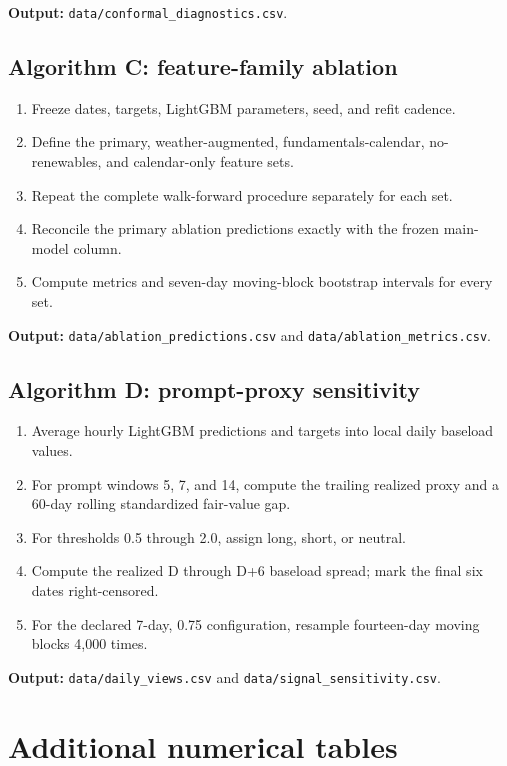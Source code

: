 \documentclass[11pt]{article}
\begin{document}
\textbf{Output:} \texttt{data/conformal\_diagnostics.csv}.

\subsection{Algorithm C: feature-family ablation}

\begin{enumerate}[leftmargin=*]
  \item Freeze dates, targets, LightGBM parameters, seed, and refit cadence.
  \item Define the primary, weather-augmented, fundamentals-calendar,
  no-renewables, and calendar-only feature sets.
  \item Repeat the complete walk-forward procedure separately for each set.
  \item Reconcile the primary ablation predictions exactly with the frozen
  main-model column.
  \item Compute metrics and seven-day moving-block bootstrap intervals for
  every set.
\end{enumerate}

\textbf{Output:} \texttt{data/ablation\_predictions.csv} and
\texttt{data/ablation\_metrics.csv}.

\subsection{Algorithm D: prompt-proxy sensitivity}

\begin{enumerate}[leftmargin=*]
  \item Average hourly LightGBM predictions and targets into local daily
  baseload values.
  \item For prompt windows 5, 7, and 14, compute the trailing realized proxy
  and a 60-day rolling standardized fair-value gap.
  \item For thresholds 0.5 through 2.0, assign long, short, or neutral.
  \item Compute the realized D through D+6 baseload spread; mark the final six
  dates right-censored.
  \item For the declared 7-day, 0.75 configuration, resample fourteen-day
  moving blocks 4,000 times.
\end{enumerate}

\textbf{Output:} \texttt{data/daily\_views.csv} and
\texttt{data/signal\_sensitivity.csv}.

\section{Additional numerical tables}
\end{document}
